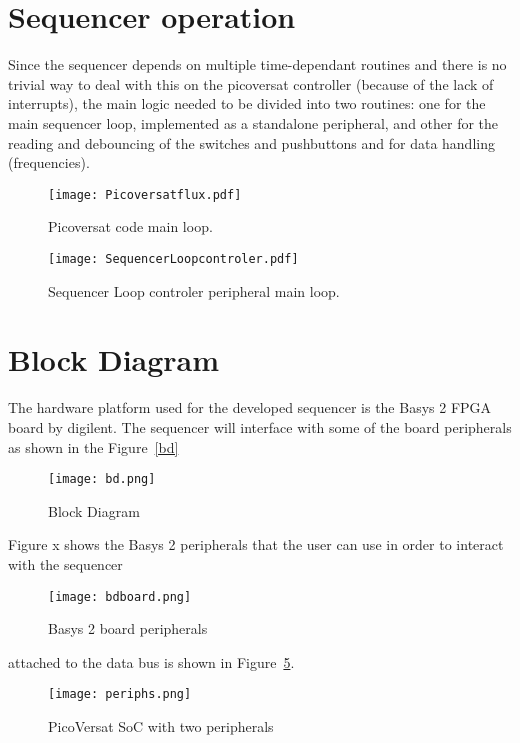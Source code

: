 
\section{Sequencer operation}

Since the sequencer depends on multiple time-dependant routines and there is no trivial way to deal with this on the picoversat controller (because of the lack of interrupts), the main logic needed to be divided into two routines: one for the main sequencer loop, implemented as a standalone peripheral, and other for the reading and debouncing of the switches and pushbuttons and for data handling (frequencies).

\begin{figure}[!htbp]
  \centerline{\texttt{[image: Picoversatflux.pdf]}}
  \vspace{0cm}\caption{Picoversat code main loop.}
  \label{fig:bd}
\end{figure}

\begin{figure}[!htbp]
  \centerline{\texttt{[image: SequencerLoopcontroler.pdf]}}
  \vspace{0cm}\caption{Sequencer Loop controler peripheral main loop.}
  \label{fig:bd}
\end{figure}


\section{Block Diagram}

The hardware platform used for the developed sequencer is the Basys 2 FPGA board by digilent. The sequencer will interface with some of the board peripherals as shown in the Figure~\ref{bd} 

\begin{figure}[!htbp]
    \centerline{\texttt{[image: bd.png]}}
    \vspace{0cm}\caption{Block Diagram}
    \label{fig:bd}
\end{figure}

Figure x shows the Basys 2 peripherals that the user can use in order to interact with the sequencer

\begin{figure}[!htbp]
  \centerline{\texttt{[image: bdboard.png]}}
  \vspace{0cm}\caption{Basys 2 board peripherals}
  \label{fig:bd}
\end{figure}



attached to the data bus is shown in Figure~\ref{fig:periphs}.

\begin{figure}[!htbp]
    \centerline{\texttt{[image: periphs.png]}}
    \vspace{0cm}\caption{PicoVersat SoC with two peripherals}
    \label{fig:periphs}
\end{figure}